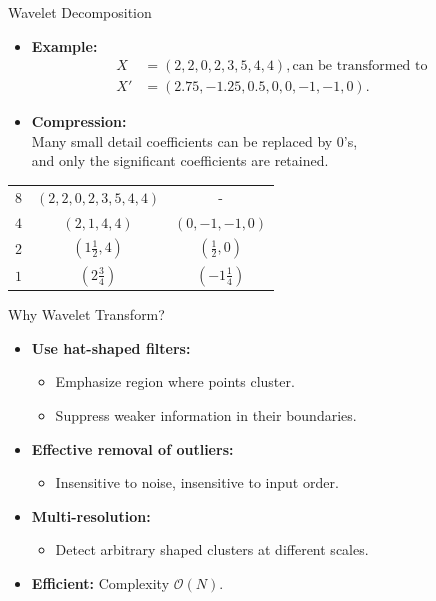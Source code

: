 \begin{frame}{Wavelet Decomposition}
	\begin{itemize}
		\item \textbf{Example:}
		\begin{align}
			X  & = (2,2,0,2,3,5,4,4), \text{can be transformed to} \\
			X' & = (2.75,-1.25,0.5,0,0,-1,-1,0).                   
		\end{align}
		\item \textbf{Compression:}\\
		Many small detail coefficients can be replaced by $0$'s, \\
		and only the significant coefficients are retained.
	\end{itemize}
	\vspace{0.2cm}
	\centering
	\begin{tabular}{|c|c|c|}
		\hline
		\text{Resolution} & \text{Averages}     & \text{Detail coefficients} 
		\\\hline
		$8$               & $(2,2,0,2,3,5,4,4)$ & -                          
		\\\hline
		$4$               & $(2,1,4,4)$         & $(0,-1,-1,0)$              
		\\\hline
		$2$               & $(1 \frac{1}{2},4)$ & $(\frac{1}{2},0)$          
		\\\hline
		$1$               & $(2 \frac{3}{4})$   & $(-1 \frac{1}{4})$         
		\\\hline
	\end{tabular}
\end{frame}

\begin{frame}{Why Wavelet Transform?}
	\begin{itemize}
		\item \textbf{Use hat-shaped filters:}
		\begin{itemize}
			\item Emphasize region where points cluster.
			\item Suppress weaker information in their boundaries.
		\end{itemize}
		\item \textbf{Effective removal of outliers:}
		\begin{itemize}
			\item Insensitive to noise, insensitive to input order.
		\end{itemize}
		\item \textbf{Multi-resolution:}
		\begin{itemize}
			\item Detect arbitrary shaped clusters at different scales.
		\end{itemize}
		\item \textbf{Efficient:} Complexity $\mathcal{O}(N)$.
	\end{itemize}
\end{frame}

